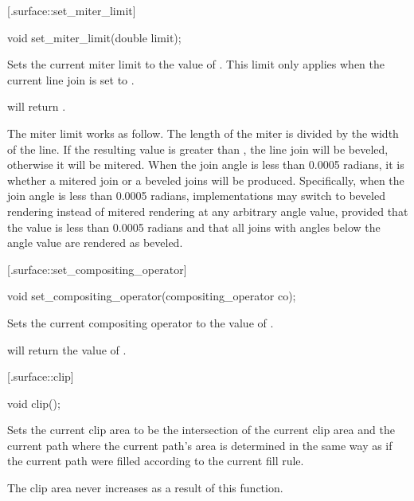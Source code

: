  [\iotwod.surface::set_miter_limit] {}

%
%
\begin{itemdecl}
void set_miter_limit(double limit);
\end{itemdecl}
\begin{itemdescr}
	\pnum
	\effects
	Sets the current miter limit to the value of . This limit only applies when the current line join is set to .
	
	\pnum
	\postconditions
	 will return .
	
	\pnum
	\remarks
	The miter limit works as follow. The length of the miter is divided by the width of the line. If the resulting value is greater than , the line join will be beveled, otherwise it will be mitered.
	\enternote
	When the join angle is less than 0.0005 radians, it is 
	 whether a mitered join or 
	a beveled joins will be produced. Specifically, when the join angle is less than 0.0005 radians, implementations may switch to beveled rendering instead of mitered rendering at any arbitrary \impdef angle value, provided that the value is less than 0.0005 radians and that all joins with angles below the \impdef angle value are rendered as beveled.
	\exitnote
\end{itemdescr}

 [\iotwod.surface::set_compositing_operator] {}

%
%
\begin{itemdecl}
void set_compositing_operator(compositing_operator co);
\end{itemdecl}
\begin{itemdescr}
	\pnum
	\effects
	Sets the current compositing operator to the value of .
	
	\pnum
	\postconditions
	 will return the value of .
\end{itemdescr}

 [\iotwod.surface::clip] {}

%
%
\begin{itemdecl}
void clip();
\end{itemdecl}
\begin{itemdescr}
	\pnum
	\effects
	Sets the current clip area to be the intersection of the current clip area and the current path where the current path's area is determined in the same way as if the current path were filled according to the current fill rule.
	
	\pnum
	\realnotes
	The clip area never increases as a result of this function.
\end{itemdescr}

